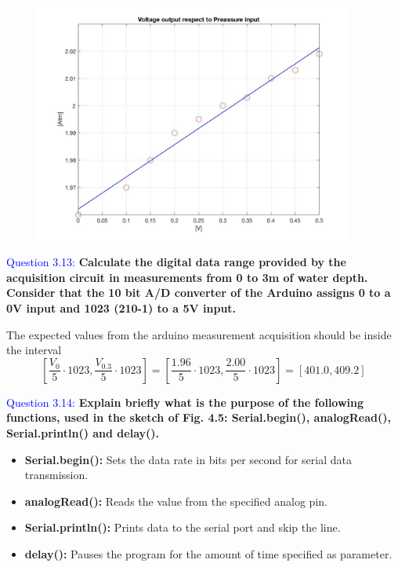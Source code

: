 \documentclass[12pt, a4papre]{article}
\begin{document}
	\begin{figure}[H]
		\begin{center}
		\includegraphics[width=105mm]{MatlabGraph1.jpg}
		\end{center}
	\end{figure}
	
	
	

	\textcolor{blue}{Question 3.13:}  \textbf{Calculate the digital data range provided by the acquisition circuit in measurements from 0 to 3m of water depth. Consider that the 10 bit A/D converter of the Arduino assigns 0 to a 0V input and 1023 (210-1) to a 5V input.}
	
	The expected values from the arduino measurement acquisition should be inside the interval
	\[
		[\frac{V_0}{5}\cdot1023, \frac{V_{0.3}}{5}\cdot1023] = [\frac{1.96}{5}\cdot1023, \frac{2.00}{5}\cdot1023] = [401.0,409.2]
	\]
	
	\textcolor{blue}{Question 3.14:} \textbf{Explain briefly what is the purpose of the following functions, used in the sketch of Fig. 4.5: Serial.begin(), analogRead(), Serial.println() and delay(). }
	\begin{itemize}
		\item \textbf{Serial.begin():} Sets the data rate in bits per second for serial data transmission.
		\item \textbf{analogRead():} Reads the value from the specified analog pin.
		\item \textbf{Serial.println():} Prints data to the serial port and skip the line.
		\item \textbf{delay():} Pauses the program for the amount of time specified as parameter.
	
	\end{itemize}
\end{document}
